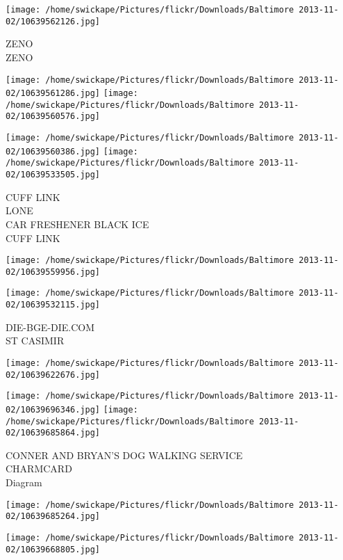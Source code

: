 \documentclass[10pt,letterpaper]{article}
\begin{document}
\vspace{0.25in}
\texttt{[image: /home/swickape/Pictures/flickr/Downloads/Baltimore 2013-11-02/10639562126.jpg]}

ZENO\\
ZENO\\
\pagebreak

\texttt{[image: /home/swickape/Pictures/flickr/Downloads/Baltimore 2013-11-02/10639561286.jpg]}
\texttt{[image: /home/swickape/Pictures/flickr/Downloads/Baltimore 2013-11-02/10639560576.jpg]}

\texttt{[image: /home/swickape/Pictures/flickr/Downloads/Baltimore 2013-11-02/10639560386.jpg]}
\texttt{[image: /home/swickape/Pictures/flickr/Downloads/Baltimore 2013-11-02/10639533505.jpg]}

CUFF LINK\\
LONE\\
CAR FRESHENER BLACK ICE\\
CUFF LINK\\
\pagebreak

\texttt{[image: /home/swickape/Pictures/flickr/Downloads/Baltimore 2013-11-02/10639559956.jpg]}

\vspace{0.25in}
\texttt{[image: /home/swickape/Pictures/flickr/Downloads/Baltimore 2013-11-02/10639532115.jpg]}

DIE{-}BGE{-}DIE.COM\\
ST CASIMIR\\
\pagebreak

\texttt{[image: /home/swickape/Pictures/flickr/Downloads/Baltimore 2013-11-02/10639622676.jpg]}

\vspace{0.25in}
\texttt{[image: /home/swickape/Pictures/flickr/Downloads/Baltimore 2013-11-02/10639696346.jpg]}
\texttt{[image: /home/swickape/Pictures/flickr/Downloads/Baltimore 2013-11-02/10639685864.jpg]}

CONNER AND BRYAN'S DOG WALKING SERVICE\\
CHARMCARD\\
Diagram\\
\pagebreak

\texttt{[image: /home/swickape/Pictures/flickr/Downloads/Baltimore 2013-11-02/10639685264.jpg]}

\vspace{0.25in}
\texttt{[image: /home/swickape/Pictures/flickr/Downloads/Baltimore 2013-11-02/10639668805.jpg]}
\end{document}
